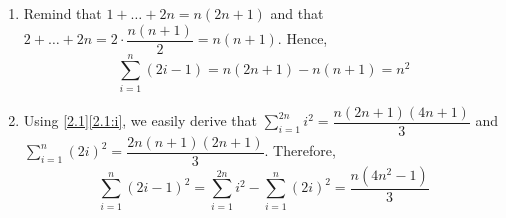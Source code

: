 \begin{solution} %
  \begin{enumerate}[label=(\roman*)]
    \item Remind that $1+\dots+2n=n(2n+1)$ and
    that $2 + \dots + 2n = 2 \cdot \dfrac{n(n+1)}{2} = n(n+1)$.
    Hence,
    \begin{equation*}
      \sum_{i=1}^n (2i - 1) = n(2n+1) - n(n+1) = n^2
    \end{equation*}
    \item Using \autoref{2.1}\ref{2.1:i}, we easily
    derive that $\displaystyle
    \sum_{i=1}^{2n} i^2 = \dfrac{n(2n+1)(4n+1)}{3}$
    and $\displaystyle
    \sum_{i=1}^n (2i)^2 = \dfrac{2n(n+1)(2n+1)}{3}$.
    Therefore,
    \begin{equation*}
      \sum_{i=1}^n (2i - 1)^2 = \sum_{i=1}^{2n} i^2
      - \sum_{i=1}^n (2i)^2
      = \frac{n(4n^2 - 1)}{3}
    \end{equation*}
  \end{enumerate}
\end{solution}

